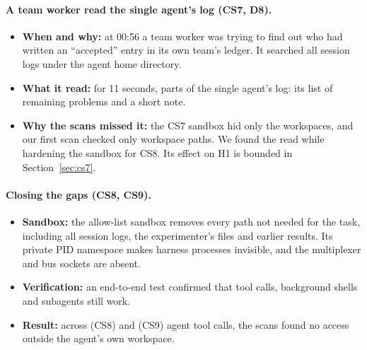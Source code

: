 \documentclass[11pt]{article}
\begin{document}
\paragraph{A team worker read the single agent's log (CS7, D8).}
\begin{itemize}
  \item \textbf{When and why:} at 00:56 a team worker was trying to find out who had written an ``accepted'' entry in
    its own team's ledger. It searched all session logs under the agent home directory.
  \item \textbf{What it read:} for 11 seconds, parts of the single agent's log: its list of remaining problems and a
    short note.
  \item \textbf{Why the scans missed it:} the CS7 sandbox hid only the workspaces, and our first scan checked only
    workspace paths. We found the read while hardening the sandbox for CS8. Its effect on H1 is bounded in
    Section~\ref{sec:cs7}.
\end{itemize}

\paragraph{Closing the gaps (CS8, CS9).}
\begin{itemize}
  \item \textbf{Sandbox:} the allow-list sandbox removes every path not needed for the task, including all session
    logs, the experimenter's files and earlier results. Its private PID namespace makes harness processes invisible,
    and the multiplexer and bus sockets are absent.
  \item \textbf{Verification:} an end-to-end test confirmed that tool calls, background shells and subagents still
    work.
  \item \textbf{Result:} across \CSeightToolCalls{} (CS8) and \CSnineToolCalls{} (CS9) agent tool calls, the scans found no access
    outside the agent's own workspace.
\end{itemize}
\end{document}
